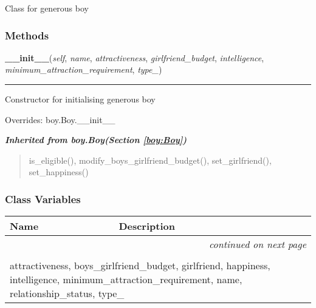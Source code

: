 Class for generous boy



  \subsubsection{Methods}

    \vspace{0.5ex}

\hspace{.8\funcindent}\begin{boxedminipage}{\funcwidth}

    \raggedright \textbf{\_\_init\_\_}(\textit{self}, \textit{name}, \textit{attractiveness}, \textit{girlfriend\_budget}, \textit{intelligence}, \textit{minimum\_attraction\_requirement}, \textit{type\_})

    \vspace{-1.5ex}

    \rule{\textwidth}{0.5\fboxrule}
\setlength{\parskip}{2ex}
    Constructor for initialising generous boy

\setlength{\parskip}{1ex}
      Overrides: boy.Boy.\_\_init\_\_

    \end{boxedminipage}


\large{\textbf{\textit{Inherited from boy.Boy\textit{(Section \ref{boy:Boy})}}}}

\begin{quote}
is\_eligible(), modify\_boys\_girlfriend\_budget(), set\_girlfriend(), set\_happiness()
\end{quote}


  \subsubsection{Class Variables}

    \vspace{-1cm}
\hspace{\varindent}\begin{longtable}{|p{\varnamewidth}|p{\vardescrwidth}|l}
\cline{1-2}
\cline{1-2} \centering \textbf{Name} & \centering \textbf{Description}& \\
\cline{1-2}
\endhead\cline{1-2}\multicolumn{3}{r}{\small\textit{continued on next page}}\\\endfoot\cline{1-2}
\endlastfoot\multicolumn{2}{|l|}{\textit{Inherited from boy.Boy \textit{(Section \ref{boy:Boy})}}}\\
\multicolumn{2}{|p{\varwidth}|}{\raggedright attractiveness, boys\_girlfriend\_budget, girlfriend, happiness, intelligence, minimum\_attraction\_requirement, name, relationship\_status, type\_}\\
\cline{1-2}
\end{longtable}

